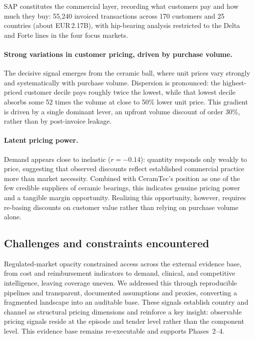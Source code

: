 \documentclass{article}
\begin{document}
SAP constitutes the commercial layer, recording what customers pay and how much they buy: 55{,}240 invoiced transactions across 170 customers and 25 countries (about EUR\,2.17B), with hip-bearing analysis restricted to the Delta and Forte lines in the four focus markets.
 
\paragraph{Strong variations in customer pricing, driven by purchase volume.}
The decisive signal emerges from the ceramic ball, where unit prices vary strongly and systematically with purchase volume. Dispersion is pronounced: the highest-priced customer decile pays roughly twice the lowest, while that lowest decile absorbs some 52 times the volume at close to 50\% lower unit price. This gradient is driven by a single dominant lever, an upfront volume discount of order 30\%, rather than by post-invoice leakage.
 
\paragraph{Latent pricing power.}
Demand appears close to inelastic ($r = -0.14$): quantity responds only weakly to price, suggesting that observed discounts reflect established commercial practice more than market necessity. Combined with CeramTec's position as one of the few credible suppliers of ceramic bearings, this indicates genuine pricing power and a tangible margin opportunity. Realizing this opportunity, however, requires re-basing discounts on customer value rather than relying on purchase volume alone.

\subsection{Challenges and constraints encountered}

Regulated-market opacity constrained access across the external evidence base, from cost and reimbursement indicators to demand, clinical, and competitive intelligence, leaving coverage uneven. We addressed this through reproducible pipelines and transparent, documented assumptions and proxies, converting a fragmented landscape into an auditable base. These signals establish country and channel as structural pricing dimensions and reinforce a key insight: observable pricing signals reside at the episode and tender level rather than the component level. This evidence base remains re-executable and supports Phases~2--4.
\end{document}
